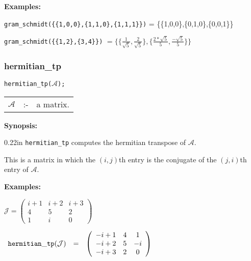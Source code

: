 {\bf Examples:}

\hspace*{0.175in}
{\tt gram\_schmidt(\{\{1,0,0\},\{1,1,0\},\{1,1,1\}\})} = 
\{\{1,0,0\},\{0,1,0\},\{0,0,1\}\}

\hspace*{0.175in}
{\tt gram\_schmidt(\{\{1,2\},\{3,4\}\})} $= 
\{\{ \frac{1}{{\sqrt{5}}} , \frac{2}{\sqrt{5}} \},
\{ \frac{2*\sqrt{5}}{5} , \frac{-\sqrt{5}}{5} \}\}$

\subsubsection{hermitian\_tp}
\label{linalg:hermitian_tp}

\hspace*{0.175in} {\tt hermitian\_tp($\mathcal{A}$);}

\hspace*{0.1in} 
\begin{tabular}{l l l}
$\mathcal{A}$ &:-& a matrix. 
\end{tabular}

{\bf Synopsis:} %

\begin{addtolength}{\leftskip}{0.22in}
         {\tt hermitian\_tp} computes the hermitian transpose of $\mathcal{A}$. 

This is a matrix in which the $(i,j)$th entry is the conjugate of the $(j,i)$th
entry of $\mathcal{A}$.

\end{addtolength}

{\bf Examples:}

\begin{flushleft}  
\hspace*{0.175in}
\begin{math}  
\mathcal{J} = \left( \begin{array}{ccc} i+1 & i+2 & i+3 \\ 4 & 5 & 2 \\ 1 &
i & 0 
\end{array} \right)
\end{math}  
\end{flushleft}

\vspace*{0.1in}

\begin{flushleft}  
\hspace*{0.1in}
\begin{math}        
\begin{array}{ccc}
{\tt hermitian\_tp}(\mathcal{J}) & = & 
\left( \begin{array}{ccc} -i+1 & 4 & 1 \\ -i+2 & 5 & -i \\-i+3 & 2 & 0
\end{array} \right)
\end{array}
\end{math}  
\end{flushleft}                   

